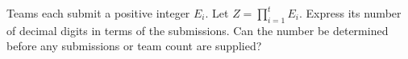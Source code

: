 Teams each submit a positive integer $E_i$. Let $Z=\prod_{i=1}^tE_i$. Express its number of decimal digits in terms of the submissions. Can the number be determined before any submissions or team count are supplied?
